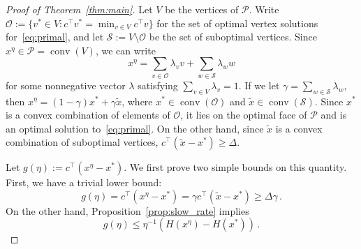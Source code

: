 \documentclass[final,12pt]{colt2018}
\newcommand{\cO}{\mathcal{O}}
\newcommand{\cP}{\mathcal{P}}
\newcommand{\cS}{\mathcal{S}}
\newcommand{\1}{\mathds{1}}
\DeclareMathOperator*{\conv}{conv}
\newcommand*{\ent}[1]{H(#1)}
\begin{document}
\begin{proof}[Proof of Theorem~\ref{thm:main}]
Let $V$ be the vertices of $\cP$.
Write $\cO := \{v^* \in V: c^\top v^* = \min_{v \in V} c^\top v\}$ for the set of optimal vertex solutions for~\eqref{eq:primal}, and let $\cS := V \setminus \cO$ be the set of suboptimal vertices.
Since $x^\eta \in \cP = \conv(V)$, we can write
\begin{equation*}
x^\eta = \sum_{v \in \cO} \lambda_v v + \sum_{w \in \cS} \lambda_w w
\end{equation*}
for some nonnegative vector $\lambda$ satisfying $\sum_{v \in V} \lambda_v = 1$.
If we let $\gamma = \sum_{w \in \cS} \lambda_w$, then $x^\eta = (1-\gamma) x^* + \gamma \tilde x$, where $x^* \in \conv(\cO)$ and $\tilde x \in \conv(\cS)$.
Since $x^*$ is a convex combination of elements of $\cO$, it lies on the optimal face of $\cP$ and is an optimal solution to~\eqref{eq:primal}.
On the other hand, since $\tilde x$ is a convex combination of suboptimal vertices, $c^\top (\tilde x - x^*) \geq \Delta$.

Let $g(\eta) := c^\top (x^\eta -  x^*)$.
We first prove two simple bounds on this quantity.
First, we have a trivial lower bound:
\begin{equation}\label{eq:g_lower_bound}
g(\eta) = c^\top(x^\eta - x^*) = \gamma c^\top (\tilde x - x^*) \geq \Delta \gamma\,.
\end{equation}
On the other hand, Proposition~\ref{prop:slow_rate} implies
\begin{equation}\label{eq:g_upper_bound}
g(\eta) \leq \eta^{-1}(\ent{x^\eta} - \ent{x^*})\,.
\end{equation}


\end{proof}
\end{document}
